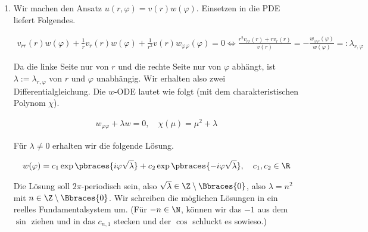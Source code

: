 

\begin{solution}

\phantom{}

\begin{enumerate}[label = (\roman*)]

    \item Wir machen den Ansatz $u(r, \varphi) = v(r) w(\varphi)$.
    Einsetzen in die PDE liefert Folgendes.

    \begin{align*}
        v_{rr}(r) w(\varphi)
        +
        \frac{1}{r}
        v_r(r)w(\varphi)
        +
        \frac{1}{r^2}
        v(r)w_{\varphi\varphi}(\varphi) = 0
        \iff
        \frac
        {
            r^2 v_{rr}(r)
            +
            r   v_r(r)
        }{v(r)}
        =
        -\frac
        {
            w_{\varphi \varphi}(\varphi)
        }{w(\varphi)}
        =:
        \lambda_{r, \varphi}
    \end{align*}

    Da die linke Seite nur von $r$ und die rechte Seite nur von $\varphi$ abhängt, ist $\lambda := \lambda_{r, \varphi}$ von $r$ und $\varphi$ unabhängig.
    Wir erhalten also zwei Differentialgleichung.
    Die $w$-ODE lautet wie folgt (mit dem charakteristischen Polynom $\chi$).

    \begin{align*}
        w_{\varphi \varphi} + \lambda w = 0,
        \quad
        \chi(\mu) = \mu^2 + \lambda
    \end{align*}

    Für $\lambda \neq 0$ erhalten wir die folgende Lösung.

    \begin{align*}
        w(\varphi)
        =
        c_1
        \exp \pbraces
        {
            i \varphi \sqrt{\lambda}
        }
        +
        c_2
        \exp \pbraces
        {
            -i \varphi \sqrt{\lambda}
        },
        \quad
        c_1, c_2 \in \R
    \end{align*}

    Die Lösung soll $2 \pi$-periodisch sein, also $\sqrt{\lambda} \in \Z \setminus \Bbraces{0}$, also $\lambda = n^2$ mit $n \in \Z \setminus \Bbraces{0}$.
    Wir schreiben die möglichen Lösungen in ein reelles Fundamentalsystem um.
    (Für $-n \in \N$, können wir das $-1$ aus dem $\sin$ ziehen und in das $c_{n, 1}$ stecken und der $\cos$ schluckt es sowieso.)


\end{enumerate}
\end{solution}
